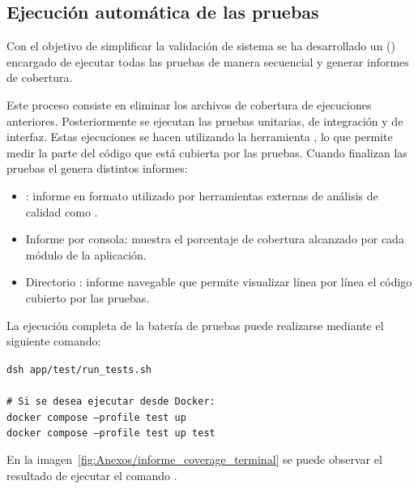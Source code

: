 \subsection{Ejecución automática de las pruebas}

Con el objetivo de simplificar la validación de sistema se ha desarrollado un  () encargado de ejecutar todas las pruebas de manera secuencial y generar informes de cobertura. 

Este proceso consiste en eliminar los archivos de cobertura de ejecuciones anteriores. Posteriormente se ejecutan las pruebas unitarias, de integración y de interfaz. Estas ejecuciones se hacen utilizando la herramienta , lo que permite medir la parte del código que está cubierta por las pruebas. Cuando finalizan las pruebas el  genera distintos informes:
\begin{itemize}
\tightlist
	\item {}: informe en formato  utilizado por herramientas externas de análisis de calidad como .
	\item Informe por consola: muestra el porcentaje de cobertura alcanzado por cada módulo de la aplicación.
	\item Directorio : informe  navegable que permite visualizar línea por línea el código cubierto por las pruebas.
\end{itemize}

La ejecución completa de la batería de pruebas puede realizarse mediante el siguiente comando:

\begin{tcolorbox}[
	colback=black!3,
	colframe=black!30,
	boxrule=0.5pt,
	arc=2mm,
	title= Terminal - Ejecución de pruebas,
	fonttitle=\bfseries,
	breakable 
]
	{\footnotesize
		\noindent
		\texttt{dsh app/test/run\_tests.sh}\\
		\\
		\texttt{\# Si se desea ejecutar desde Docker:}\\
		\texttt{docker compose --profile test up}\\
		\texttt{docker compose --profile test up test}
	}
\end{tcolorbox}

En la imagen~\ref{fig:Anexos/informe_coverage_terminal} se puede observar el resultado de ejecutar el comando .

